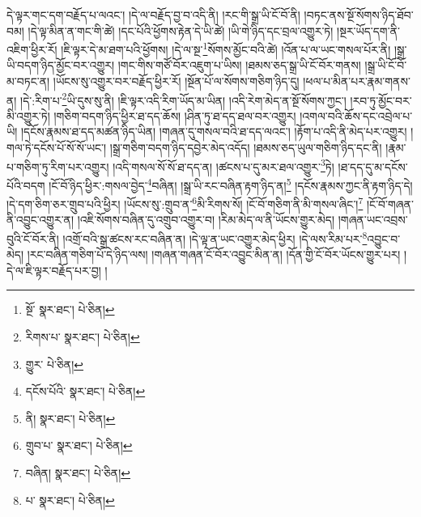 དེ་ལྟར་གང་དག་བརྗོད་པ་ལའང་། །དེ་ལ་བརྗོད་བྱ་བ་འདི་ནི། །རང་གི་སྒྲ་ཡི་ངོ་བོ་ནི། །བཏང་ནས་སྔོ་སོགས་ཉིད་ཐོབ་བམ། །དེ་ལྟ་མིན་ན་གང་གི་ཚེ། །དང་པོའི་ཕྱོགས་རྟེན་དེ་ཡི་ཚེ། །ཡི་གེ་ཉིད་དང་བྲལ་འགྱུར་ཏེ། །སྔར་ཡོད་དག་ནི་འཇིག་ཕྱིར་རོ། །ཇི་ལྟར་དེ་མ་ཐག་པའི་ཕྱོགས། །དེ་ལ་སྔ་\footnote{སྔོ་  སྣར་ཐང་།  པེ་ཅིན། }སོགས་མྱོང་བའི་ཚེ། །འོན་པ་ལ་ཡང་གསལ་པོར་ནི། །སྒྲ་ཡི་བདག་ཉིད་མྱོང་བར་འགྱུར། །གང་གིས་གཙོ་བོར་འཇུག་པ་ཡིས། །ཐམས་ཅད་སྒྲ་ཡི་ངོ་བོར་གནས། །སྒྲ་ཡི་ངོ་བོ་མ་བཏང་ན། །ཡོངས་སུ་འགྱུར་བར་བརྗོད་ཕྱིར་རོ། །སྔོན་པོ་ལ་སོགས་གཅིག་ཉིད་དུ། །ཕལ་པ་མིན་པར་རྣམ་གནས་ན། །དེ་:རིག་པ་\footnote{རིགས་པ་  སྣར་ཐང་།  པེ་ཅིན། }ཡི་དུས་སུ་ནི། །ཇི་ལྟར་འདི་རིག་ཡོད་མ་ཡིན། །འདི་རེག་མེད་ན་སྔོ་སོགས་ཀྱང་། །རབ་ཏུ་མྱོང་བར་མི་འགྱུར་ཏེ། །གཅིག་བདག་ཉིད་ཕྱིར་ཐ་དད་ཆོས། །ཤིན་ཏུ་ཐ་དད་ཐལ་བར་འགྱུར། །འགལ་བའི་ཆོས་དང་འབྲེལ་པ་ཡི། །དངོས་རྣམས་ཐ་དད་མཚན་ཉིད་ཡིན། །གཞན་དུ་གསལ་བའི་ཐ་དད་ལའང་། །རྟོག་པ་འདི་ནི་མེད་པར་འགྱུར། །གལ་ཏེ་དངོས་པོ་སོ་སོ་ཡང་། །སྒྲ་གཅིག་བདག་ཉིད་དབྱེར་མེད་འདོད། །ཐམས་ཅད་ཡུལ་གཅིག་ཉིད་དང་ནི། །རྣམ་པ་གཅིག་ཏུ་རིག་པར་འགྱུར། །འདི་གསལ་སོ་སོ་ཐ་དད་ན། །ཚངས་པ་དུ་མར་ཐལ་འགྱུར་\footnote{གྱུར་  པེ་ཅིན། }ཏེ། །ཐ་དད་དུ་མ་དངོས་པོའི་བདག །ངོ་བོ་ཉིད་ཕྱིར་:གསལ་བྱེད་\footnote{དངོས་པོའི་  སྣར་ཐང་།  པེ་ཅིན། }བཞིན། །སྒྲ་ཡི་རང་བཞིན་རྟག་ཉིད་ན།\footnote{ནི།  སྣར་ཐང་།  པེ་ཅིན། } །དངོས་རྣམས་ཀྱང་ནི་རྟག་ཉིད་དེ། །དེ་དག་ཅིག་ཅར་གྲུབ་པའི་ཕྱིར། །ཡོངས་སུ་:གྲུབ་ན་\footnote{གྲུབ་པ་  སྣར་ཐང་།  པེ་ཅིན། }མི་རིགས་སོ། །ངོ་བོ་གཅིག་ནི་མི་གསལ་ཞིང་།\footnote{བཞིན།  སྣར་ཐང་།  པེ་ཅིན། } །ངོ་བོ་གཞན་ནི་འབྱུང་འགྱུར་ན། །འཇི་སོགས་བཞིན་དུ་འགྲུབ་འགྱུར་བ། །རིམ་མེད་ལ་ནི་ཡོངས་གྱུར་མེད། །གཞན་ཡང་འབྲས་བུའི་ངོ་བོར་ནི། །འགྲོ་བའི་སྒྲ་ཚངས་རང་བཞིན་ན། །དེ་ལྟ་ན་ཡང་འགྱུར་མེད་ཕྱིར། །དེ་ལས་རིམ་པར་\footnote{པ་  སྣར་ཐང་།  པེ་ཅིན། }འབྱུང་བ་མེད། །རང་བཞིན་གཅིག་པོ་དེ་ཉིད་ལས། །གཞན་གཞན་ངོ་བོར་འབྱུང་མིན་ན། །དོན་གྱི་ངོ་བོར་ཡོངས་གྱུར་པར། །དེ་ལ་ཇི་ལྟར་བརྗོད་པར་བྱ། །
